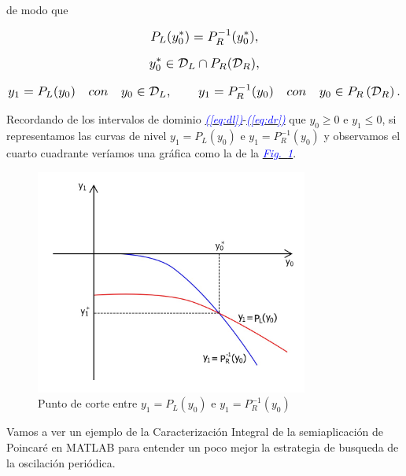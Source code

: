 \documentclass[12pt,a4paper]{report} %
\newcommand{\fref}[1]{\hyperref[#1]{\textcolor{blue}{\textit{Fig.~\ref*{#1}}}}}
\newcommand{\eref}[1]{\hyperref[#1]{\textcolor{blue}{\textit{(\ref*{#1})}}}}
\begin{document}
	\noindent de modo que
	
	\begin{equation*}
		\scalebox{1.2}{$\displaystyle
		P_L(y_0^*)=P_R^{-1}(y_0^*),
		$}
	\end{equation*}
	
	\begin{equation*}
		\scalebox{1.2}{$\displaystyle
		y_0^* \in \mathcal{D}_L \cap P_R(\mathcal{D}_R),
		$}
	\end{equation*}
	
	\begin{equation*}
		\scalebox{1.2}{$\displaystyle
			y_1=P_L(y_0) \quad con \quad y_0\in\mathcal{D}_L, \qquad y_1=P_R^{-1}(y_0) \quad con \quad y_0\in P_R\left(\mathcal{D}_R\right).
			$}
	\end{equation*}
	
	\vspace{0.5cm}\noindent Recordando de los intervalos de dominio \eref{eq:dl}-\eref{eq:dr} que $y_0\geq0$ e $y_1\leq0$, si representamos las curvas de nivel $y_1=P_L(y_0)$ e $y_1=P_R^{-1}(y_0)$ y observamos el cuarto cuadrante veríamos una gráfica como la de la \fref{fig:graficaejemplo}.
	
		\begin{figure}[h]
		\centering
		\includegraphics[width=0.8\textwidth]{graficaejemplo.jpg}
		\caption{Punto de corte entre $y_1=P_L(y_0)$ e $y_1=P_R^{-1}(y_0)$}
		\label{fig:graficaejemplo}
	\end{figure}\smallskip
	
	\newpage
	
	\vspace{0.5cm} Vamos a ver un ejemplo de la Caracterización Integral de la semiaplicación de Poincaré en MATLAB para entender un poco mejor la estrategia de busqueda de la oscilación periódica.
	
\end{document}
